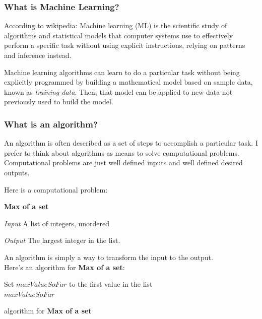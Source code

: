 \documentclass[12pt]{article}
\begin{document}
\subsubsection{What is Machine Learning?}

According to wikipedia:
Machine learning (ML) is the scientific study of algorithms and statistical models that computer systems use to effectively perform a specific task without using explicit instructions, relying on patterns and inference instead.

Machine learning algorithms can learn to do a particular task without being explicitly programmed by building a mathematical model based on sample data, known as \textit{training data}. Then, that model can be applied to new data not previously used to build the model.

\subsubsection{What is an algorithm?}

An algorithm is often described as a set of steps to accomplish a particular task. I prefer to think about algorithms as means to solve computational problems. Computational problems are just well defined inputs and well defined desired outputs.

Here is a computational problem:

\textbf{Max of a set}

\textit{Input} A list of integers, unordered

\textit{Output} The largest integer in the list. 

An algorithm is simply a way to transform the input to the output. \\


Here's an algorithm for \textbf{Max of a set}:\\

\begin{algorithm}[H]
    \SetAlgoLined
    Set $maxValueSoFar$ to the first value in the list \\
    
    \Return $maxValueSoFar$

    \caption{algorithm for \textbf{Max of a set}}
\end{algorithm}
\end{document}
